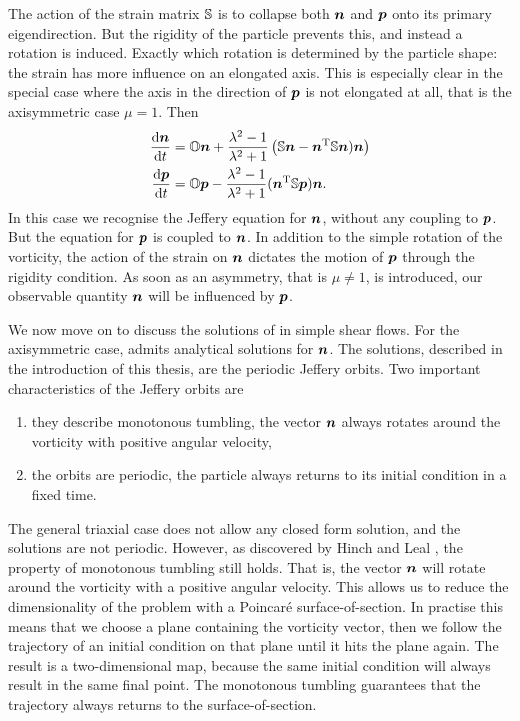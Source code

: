 \documentclass[thesis.tex]{subfiles}
\begin{document}
The action of the strain matrix $\mathbb{S}$ is to collapse both $\mbox{\boldmath$n$}$ and $\mbox{\boldmath$p$}$ onto its primary eigendirection. But the rigidity of the particle prevents this, and instead a rotation is induced. Exactly which rotation is determined by the particle shape: the strain has more influence on an elongated axis. This is especially clear in the special case where the axis in the direction of $\mbox{\boldmath$p$}$ is not elongated at all, that is the axisymmetric case $\mu = 1$. Then
\begin{align}
	\diff{\ve{n}}{t} &= \ma O \ve{n} + \frac{\lambda^2-1}{\lambda^2+1} \left(\ma S \ve n- \ve{n}\transpose \ma S \ve{n})\ve{n}\right) \nn\\
	\diff{\ve{p}}{t} &= \ma O \ve{p} - \frac{   \lambda^2-1 }{\lambda^2+1}(\ve{n}\transpose \ma S \ve{p})\ve{n}.\eqnlab{triaxial_equation_symm}
\end{align}
In this case we recognise the Jeffery equation for $\mbox{\boldmath$n$}$, without any coupling to $\mbox{\boldmath$p$}$. But the equation for $\mbox{\boldmath$p$}$ is coupled to $\mbox{\boldmath$n$}$.  In addition to the simple rotation of the vorticity, the action of the strain on $\mbox{\boldmath$n$}$ dictates the motion of $\mbox{\boldmath$p$}$ through the rigidity condition. As soon as an asymmetry, that is $\mu \neq 1$, is introduced, our observable quantity $\mbox{\boldmath$n$}$ will be influenced by $\mbox{\boldmath$p$}$.

We now move on to discuss the solutions of  in simple shear flows. For the axisymmetric case,  admits analytical solutions for $\mbox{\boldmath$n$}$. The solutions, described in the introduction of this thesis, are the periodic Jeffery orbits. Two important characteristics of the Jeffery orbits are
\begin{enumerate}
	\item they describe monotonous tumbling, the vector $\mbox{\boldmath$n$}$ always rotates around the vorticity with positive angular velocity,
	\item the orbits are periodic, the particle always returns to its initial condition in a fixed time.
\end{enumerate}
The general triaxial case does not allow any closed form solution, and the solutions are not periodic. However, as discovered by Hinch and Leal \cite{hinch1979}, the property of monotonous tumbling still holds. That is, the vector $\mbox{\boldmath$n$}$ will rotate around the vorticity with a positive angular velocity. This allows us to reduce the dimensionality of the problem with a Poincar\'e surface-of-section. In practise this means that we choose a plane containing the vorticity vector, then we follow the trajectory of an initial condition on that plane until it hits the plane again. The result is a two-dimensional map, because the same initial condition will always result in the same final point. The monotonous tumbling guarantees that the trajectory always returns to the surface-of-section.
\end{document}
